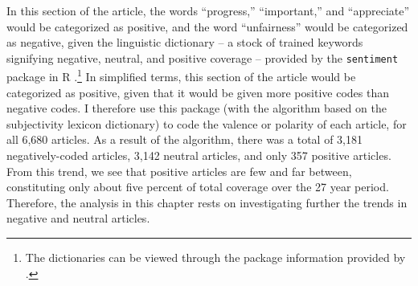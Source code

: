 In this section of the article, the words ``progress,'' ``important,'' and ``appreciate'' would be categorized as positive, and the word ``unfairness'' would be categorized as negative, given the linguistic dictionary -- a stock of trained keywords signifying negative, neutral, and positive coverage -- provided by the \texttt{sentiment} package in \textsf{R} \citep{jurka_2012}.\footnote{The dictionaries can be viewed through the package information provided by \citet{jurka_2012}.} In simplified terms, this section of the article would be categorized as positive, given that it would be given more positive codes than negative codes. I therefore use this package (with the algorithm based on the subjectivity lexicon dictionary) to code the valence or polarity of each article, for all 6,680 articles. As a result of the algorithm, there was a total of 3,181 negatively-coded articles, 3,142 neutral articles, and only 357 positive articles. From this trend, we see that positive articles are few and far between, constituting only about five percent of total coverage over the 27 year period. Therefore, the analysis in this chapter rests on investigating further the trends in negative and neutral articles. 









